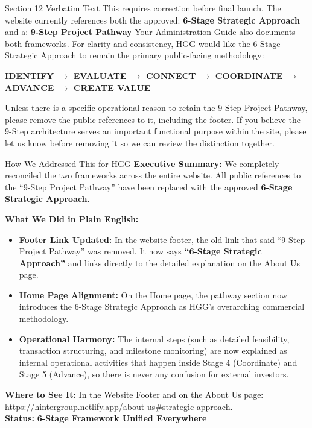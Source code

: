 \documentclass[11pt,a4paper]{article}
\begin{document}
\begin{VerbatimClientBox}{Section 12 Verbatim Text}
This requires correction before final launch.
The website currently references both the approved:
\textbf{6-Stage Strategic Approach}
and a:
\textbf{9-Step Project Pathway}
Your Administration Guide also documents both frameworks.
For clarity and consistency, HGG would like the 6-Stage Strategic Approach to remain the primary public-facing methodology:
\begin{center}
\textbf{IDENTIFY $\rightarrow$ EVALUATE $\rightarrow$ CONNECT $\rightarrow$ COORDINATE $\rightarrow$ ADVANCE $\rightarrow$ CREATE VALUE}
\end{center}
Unless there is a specific operational reason to retain the 9-Step Project Pathway, please remove the public references to it, including the footer.
If you believe the 9-Step architecture serves an important functional purpose within the site, please let us know before removing it so we can review the distinction together.
\end{VerbatimClientBox}

\begin{DetailedResolutionBox}{How We Addressed This for HGG}
\textbf{Executive Summary:} We completely reconciled the two frameworks across the entire website. All public references to the ``9-Step Project Pathway'' have been replaced with the approved \textbf{6-Stage Strategic Approach}.

\textbf{What We Did in Plain English:}
\begin{itemize}
    \item \textbf{Footer Link Updated:} In the website footer, the old link that said ``9-Step Project Pathway'' was removed. It now says \textbf{``6-Stage Strategic Approach''} and links directly to the detailed explanation on the About Us page.
    \item \textbf{Home Page Alignment:} On the Home page, the pathway section now introduces the 6-Stage Strategic Approach as HGG's overarching commercial methodology.
    \item \textbf{Operational Harmony:} The internal steps (such as detailed feasibility, transaction structuring, and milestone monitoring) are now explained as internal operational activities that happen inside Stage 4 (Coordinate) and Stage 5 (Advance), so there is never any confusion for external investors.
\end{itemize}

\textbf{Where to See It:} In the Website Footer and on the About Us page: \url{https://hintergroup.netlify.app/about-us#strategic-approach}. \\
\textbf{Status:} \textcolor{HGGGreen}{\textbf{6-Stage Framework Unified Everywhere}}
\end{DetailedResolutionBox}
\end{document}
